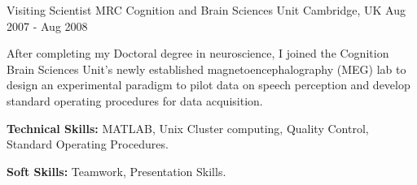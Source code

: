 \begin{cventries}
  \cventry
  {Visiting Scientist} %
  {MRC Cognition and Brain Sciences Unit} %
  {Cambridge, UK} %
  {Aug 2007 - Aug 2008} %
  {
    \begin{cvitems} %
      \item {After completing my Doctoral degree in neuroscience, I joined the Cognition Brain Sciences Unit's newly established magnetoencephalography (MEG) lab to design an experimental paradigm to pilot data on speech perception and develop standard operating procedures for data acquisition.}
      \item {\textbf{Technical Skills:} MATLAB, Unix Cluster computing, Quality Control, Standard Operating Procedures.}
      \item {\textbf{Soft Skills:} Teamwork, Presentation Skills.}
    \end{cvitems}
  }

\end{cventries}
